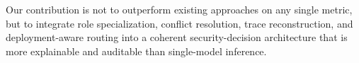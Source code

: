 Our contribution is not to outperform existing approaches on any single metric, but to integrate role specialization, conflict resolution, trace reconstruction, and deployment-aware routing into a coherent security-decision architecture that is more explainable and auditable than single-model inference.
